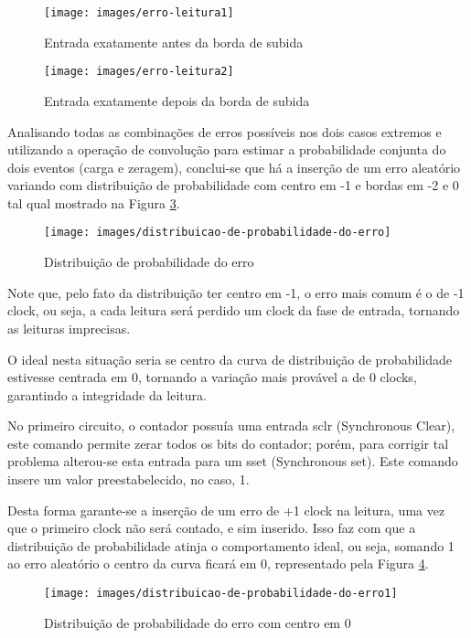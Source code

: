\documentclass[12pt,a4paper,openany]{abntex2}
\begin{document}
\begin{figure}[!htp]
	\centering
	\caption{Entrada exatamente antes da borda de subida}
	\texttt{[image: images/erro-leitura1]}
	\label{fig:erro-leitura1}
\end{figure}

\begin{figure}[!htp]
	\centering
	\caption{Entrada exatamente depois da borda de subida}
	\texttt{[image: images/erro-leitura2]}
	\label{fig:erro-leitura2}
\end{figure}

Analisando todas as combinações de erros possíveis nos dois casos extremos e utilizando a operação de convolução para estimar a probabilidade conjunta do dois eventos (carga e zeragem), conclui-se que há a inserção de um erro aleatório variando com distribuição de probabilidade com centro em -1 e bordas em -2 e 0 tal qual mostrado na Figura \ref{fig:distribuicao-de-probabilidade-do-erro}.

\begin{figure}[!htp]
	\centering
	\caption{Distribuição de probabilidade do erro}
	\texttt{[image: images/distribuicao-de-probabilidade-do-erro]}
	\label{fig:distribuicao-de-probabilidade-do-erro}
\end{figure}

Note que, pelo fato da distribuição ter centro em -1, o erro mais comum é o de -1 clock, ou seja, a cada leitura será perdido um clock da fase de entrada, tornando as leituras imprecisas. 

O ideal nesta situação seria se centro da curva de distribuição de probabilidade estivesse centrada em 0, tornando a variação mais provável a de 0 clocks, garantindo a integridade da leitura.

No primeiro circuito, o contador possuía uma entrada sclr (Synchronous Clear), este comando permite zerar todos os bits do contador; porém, para corrigir tal problema alterou-se esta entrada para um sset (Synchronous set). Este comando insere um valor preestabelecido, no caso, 1.

Desta forma garante-se a inserção de um erro de +1 clock na leitura, uma vez que o primeiro clock não será contado, e sim inserido. Isso faz com que a distribuição de probabilidade atinja o comportamento ideal, ou seja, somando 1 ao erro aleatório o centro da curva ficará em 0, representado pela Figura \ref{fig:distribuicao-de-probabilidade-do-erro1}.

\begin{figure}[!htp]
	\centering
	\caption{Distribuição de probabilidade do erro com centro em 0}
	\texttt{[image: images/distribuicao-de-probabilidade-do-erro1]}
	\label{fig:distribuicao-de-probabilidade-do-erro1}
\end{figure}
\end{document}
